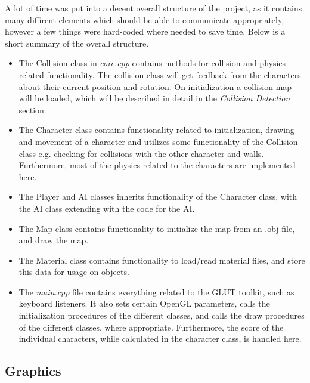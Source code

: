 \documentclass[12pt,a4paper,titlepage]{article}
\begin{document}
A lot of time was put into a decent overall structure of the project, as it
contains many diffirent elements which should be able to communicate
appropriately, however a few things were hard-coded where needed to save
time. Below is a short summary of the overall structure.

\begin{itemize}
\item The Collision class in \emph{core.cpp} contains methods for collision
and physics related functionality. The collision class will get feedback
from the characters about their current position and rotation. On
initialization a collision map will be loaded, which will be described in
detail in the \emph{Collision Detection} section.

\item The Character class contains functionality related to initialization,
drawing and movement of a character and utilizes some functionality of
the Collision class e.g. checking for collisions with the other character
and walls. Furthermore, most of the physics related to the characters are
implemented here.

\item The Player and AI classes inherits functionality of the Character
class, with the AI class extending with the code for the AI.

\item The Map class contains functionality to initialize the map from an .obj-file,
and draw the map.

\item The Material class contains functionality to load/read material files, and
store this data for usage on objects.

\item The \emph{main.cpp} file contains everything related to the GLUT toolkit, such
as keyboard listeners. It also sets certain OpenGL parameters, calls the
initialization procedures of the different classes, and calls the draw
procedures of the different classes, where appropriate. Furthermore, the
score of the individual characters, while calculated in the character
class, is handled here.
\end{itemize}

\subsection*{Graphics}
\label{sec-2-2}
\end{document}
